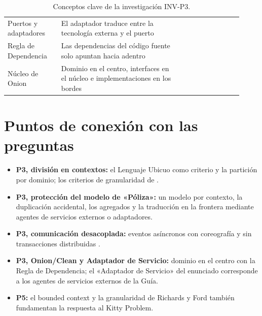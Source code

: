 \begin{table}[htbp]
\begin{tabular}{@{}p{0.21\linewidth}p{0.47\linewidth}p{0.24\linewidth}@{}}
    \raggedright Puertos y adaptadores
      & \raggedright El adaptador traduce entre la tecnología externa y el puerto
      & \raggedright \textcite[«Intent»]{cockburn2005} \tabularnewline
    \raggedright Regla de Dependencia
      & \raggedright Las dependencias del código fuente solo apuntan hacia adentro
      & \raggedright \textcite[203]{martin2017} \tabularnewline
    \raggedright Núcleo de Onion
      & \raggedright Dominio en el centro, interfaces en el núcleo e implementaciones en los bordes
      & \raggedright \textcite{palermo2008} \tabularnewline
    \bottomrule
  \end{tabular}
  \caption{Conceptos clave de la investigación INV-P3.}
  \label{tab:inv-p3-conceptos}
\end{table}

\section{Puntos de conexión con las preguntas}

\begin{itemize}
  \item \textbf{P3, división en contextos:} el Lenguaje Ubicuo como criterio y la
        partición por dominio; los criterios de granularidad de
        \textcite[cap.~17]{richardsford2020}.
  \item \textbf{P3, protección del modelo de «Póliza»:} un modelo por contexto, la
        duplicación accidental, los agregados y la traducción en la frontera mediante
        agentes de servicios externos o adaptadores.
  \item \textbf{P3, comunicación desacoplada:} eventos asíncronos con coreografía y sin
        transacciones distribuidas \parencite[caps.~14 y 17]{richardsford2020}.
  \item \textbf{P3, Onion/Clean y Adaptador de Servicio:} dominio en el centro con la
        Regla de Dependencia; el «Adaptador de Servicio» del enunciado corresponde a los
        agentes de servicios externos de la Guía.
  \item \textbf{P5:} el bounded context y la granularidad de Richards y Ford también
        fundamentan la respuesta al Kitty Problem.
\end{itemize}


